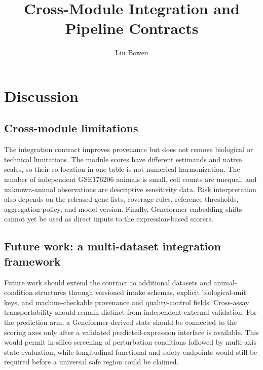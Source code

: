 \documentclass[10pt,twocolumn]{article}
\title{Cross-Module Integration and Pipeline Contracts}
\author{Liu Bowen}
\date{}
\begin{document}
\maketitle


\setcounter{section}{2}
\section{Discussion}

\subsection{Cross-module limitations}
\label{sec:cross-module-limitations}

The integration contract improves provenance but does not remove biological or
technical limitations. The module scores have different estimands and native
scales, so their co-location in one table is not numerical harmonization. The
number of independent GSE176206 animals is small, cell counts are unequal, and
unknown-animal observations are descriptive sensitivity data. Risk interpretation
also depends on the released gene lists, coverage rules, reference thresholds,
aggregation policy, and model version. Finally, Geneformer embedding shifts
cannot yet be used as direct inputs to the expression-based scorers.

\subsection{Future work: a multi-dataset integration framework}
\label{sec:future-multidataset-integration}

Future work should extend the contract to additional datasets and animal-condition
structures through versioned intake schemas, explicit biological-unit keys, and
machine-checkable provenance and quality-control fields. Cross-assay
transportability should remain distinct from independent external validation.
For the prediction arm, a Geneformer-derived state should be connected to the
scoring axes only after a validated predicted-expression interface is available.
This would permit in-silico screening of perturbation conditions followed by
multi-axis state evaluation, while longitudinal functional and safety endpoints
would still be required before a universal safe region could be claimed.
\end{document}
